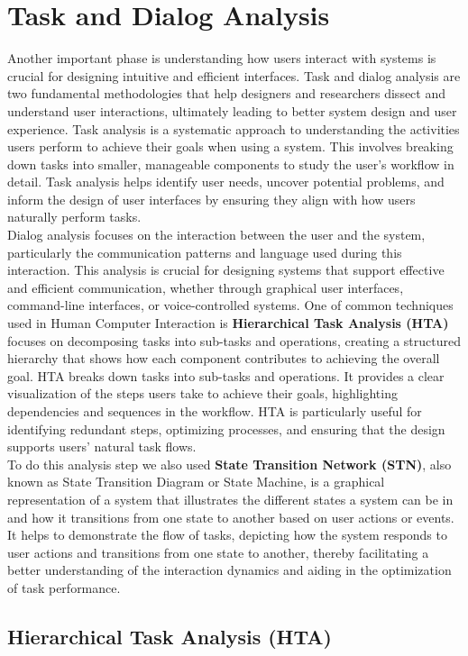 \section{Task and Dialog Analysis}
Another important phase is understanding how users interact with systems is crucial for designing intuitive and efficient interfaces. Task and dialog analysis are two fundamental methodologies that help designers and researchers dissect and understand user interactions, ultimately leading to better system design and user experience. Task analysis is a systematic approach to understanding the activities users perform to achieve their goals when using a system. This involves breaking down tasks into smaller, manageable components to study the user's workflow in detail. Task analysis helps identify user needs, uncover potential problems, and inform the design of user interfaces by ensuring they align with how users naturally perform tasks.\\
Dialog analysis focuses on the interaction between the user and the system, particularly the communication patterns and language used during this interaction. This analysis is crucial for designing systems that support effective and efficient communication, whether through graphical user interfaces, command-line interfaces, or voice-controlled systems.
One of common techniques used in Human Computer Interaction is \textbf{Hierarchical Task Analysis (HTA)} focuses on decomposing tasks into sub-tasks and operations, creating a structured hierarchy that shows how each component contributes to achieving the overall goal. HTA breaks down tasks into sub-tasks and operations. It provides a clear visualization of the steps users take to achieve their goals, highlighting dependencies and sequences in the workflow. HTA is particularly useful for identifying redundant steps, optimizing processes, and ensuring that the design supports users' natural task flows.\\
To do this analysis step we also used \textbf{State Transition Network (STN)}, also known as State Transition Diagram or State Machine, is a graphical representation of a system that illustrates the different states a system can be in and how it transitions from one state to another based on user actions or events. It helps to demonstrate the flow of tasks, depicting how the system responds to user actions and transitions from one state to another, thereby facilitating a better understanding of the interaction dynamics and aiding in the optimization of task performance.
\subsection{Hierarchical Task Analysis (HTA)}
